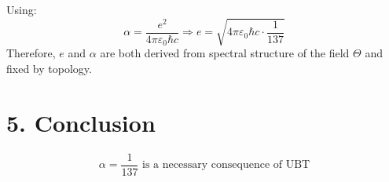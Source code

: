 \documentclass[12pt,a4paper]{article}
\begin{document}
Using:
\[
\alpha = \frac{e^2}{4\pi \varepsilon_0 \hbar c} \Rightarrow e = \sqrt{4\pi \varepsilon_0 \hbar c \cdot \frac{1}{137}}
\]
Therefore, $e$ and $\alpha$ are both derived from spectral structure of the field $\Theta$ and fixed by topology.

\section*{5. Conclusion}

\[
\boxed{\alpha = \frac{1}{137} \text{ is a necessary consequence of UBT}}
\]
\end{document}
